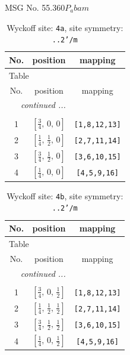 \documentclass[fleqn,8pt]{jsarticle}
\begin{document}
\setcounter{MaxMatrixCols}{32}

\renewcommand{\tablename}{Table~}
\renewcommand{\figurename}{Figure~}
\begin{center}
\LARGE
MSG No. 55.360\quad$P_{a}bam$
\end{center}
\renewcommand{\arraystretch}{1.2}
\begin{longtable}{ccc}
\caption{Wyckoff site: {\tt 4a}, site symmetry: {\tt ..2'/m}}
 \\
 \hline \hline
No. & position & mapping \\ \hline \endfirsthead

\multicolumn{2}{l}{\tablename\ \thetable{}} \\
 \hline \hline
No. & position & mapping \\ \hline \endhead

 \hline \hline
\multicolumn{2}{r}{\footnotesize\it continued ...} \\ \endfoot

 \hline \hline
\multicolumn{2}{r}{} \\ \endlastfoot

1 & $\left[ \frac{3}{4},\, 0,\, 0 \right]$ & {\tt [1,8,12,13]} \\ \hline
2 & $\left[ \frac{1}{4},\, \frac{1}{2},\, 0 \right]$ & {\tt [2,7,11,14]} \\ \hline
3 & $\left[ \frac{3}{4},\, \frac{1}{2},\, 0 \right]$ & {\tt [3,6,10,15]} \\ \hline
4 & $\left[ \frac{1}{4},\, 0,\, 0 \right]$ & {\tt [4,5,9,16]} \\
\end{longtable}
\renewcommand{\arraystretch}{1.2}
\begin{longtable}{ccc}
\caption{Wyckoff site: {\tt 4b}, site symmetry: {\tt ..2'/m}}
 \\
 \hline \hline
No. & position & mapping \\ \hline \endfirsthead

\multicolumn{2}{l}{\tablename\ \thetable{}} \\
 \hline \hline
No. & position & mapping \\ \hline \endhead

 \hline \hline
\multicolumn{2}{r}{\footnotesize\it continued ...} \\ \endfoot

 \hline \hline
\multicolumn{2}{r}{} \\ \endlastfoot

1 & $\left[ \frac{3}{4},\, 0,\, \frac{1}{2} \right]$ & {\tt [1,8,12,13]} \\ \hline
2 & $\left[ \frac{1}{4},\, \frac{1}{2},\, \frac{1}{2} \right]$ & {\tt [2,7,11,14]} \\ \hline
3 & $\left[ \frac{3}{4},\, \frac{1}{2},\, \frac{1}{2} \right]$ & {\tt [3,6,10,15]} \\ \hline
4 & $\left[ \frac{1}{4},\, 0,\, \frac{1}{2} \right]$ & {\tt [4,5,9,16]} \\
\end{longtable}
\end{document}
